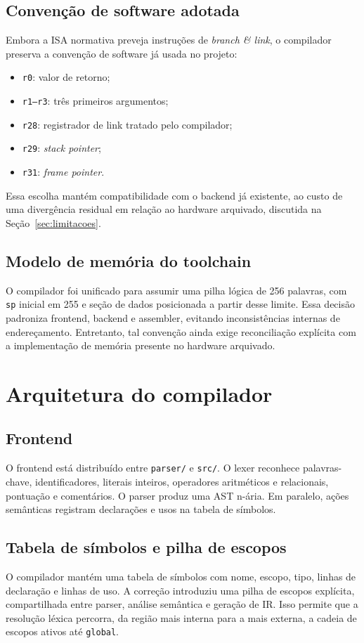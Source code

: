 \documentclass[12pt,a4paper]{article}
\begin{document}
\subsection{Convenção de software adotada}
Embora a ISA normativa preveja instruções de \emph{branch \& link}, o compilador preserva a convenção de software já usada no projeto:
\begin{itemize}[leftmargin=1.5em]
    \item \texttt{r0}: valor de retorno;
    \item \texttt{r1--r3}: três primeiros argumentos;
    \item \texttt{r28}: registrador de link tratado pelo compilador;
    \item \texttt{r29}: \emph{stack pointer};
    \item \texttt{r31}: \emph{frame pointer}.
\end{itemize}
Essa escolha mantém compatibilidade com o backend já existente, ao custo de uma divergência residual em relação ao hardware arquivado, discutida na Seção~\ref{sec:limitacoes}.

\subsection{Modelo de memória do toolchain}
O compilador foi unificado para assumir uma pilha lógica de 256 palavras, com \texttt{sp} inicial em 255 e seção de dados posicionada a partir desse limite. Essa decisão padroniza frontend, backend e assembler, evitando inconsistências internas de endereçamento. Entretanto, tal convenção ainda exige reconciliação explícita com a implementação de memória presente no hardware arquivado.

\section{Arquitetura do compilador}
\subsection{Frontend}
O frontend está distribuído entre \texttt{parser/} e \texttt{src/}. O lexer reconhece palavras-chave, identificadores, literais inteiros, operadores aritméticos e relacionais, pontuação e comentários. O parser produz uma AST n-ária. Em paralelo, ações semânticas registram declarações e usos na tabela de símbolos.

\subsection{Tabela de símbolos e pilha de escopos}
O compilador mantém uma tabela de símbolos com nome, escopo, tipo, linhas de declaração e linhas de uso. A correção introduziu uma pilha de escopos explícita, compartilhada entre parser, análise semântica e geração de IR. Isso permite que a resolução léxica percorra, da região mais interna para a mais externa, a cadeia de escopos ativos até \texttt{global}.
\end{document}

